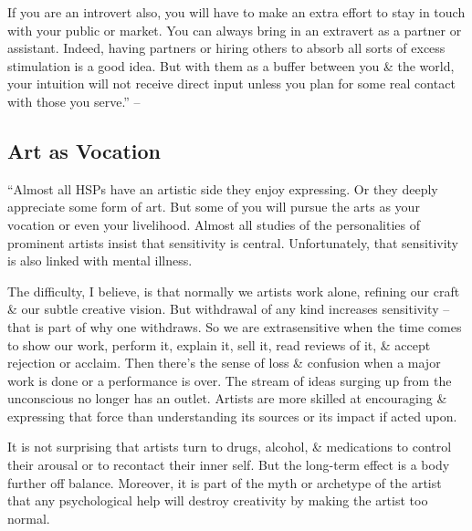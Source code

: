 \documentclass{article}
\numberwithin{equation}{section}
\begin{document}
If you are an introvert also, you will have to make an extra effort to stay in touch with your public or market. You can always bring in an extravert as a partner or assistant. Indeed, having partners or hiring others to absorb all sorts of excess stimulation is a good idea. But with them as a buffer between you \& the world, your intuition will not receive direct input unless you plan for some real contact with those you serve.'' -- \cite[pp. 154--155]{Aron2013}

\subsection{Art as Vocation}
``Almost all HSPs have an artistic side they enjoy expressing. Or they deeply appreciate some form of art. But some of you will pursue the arts as your vocation or even your livelihood. Almost all studies of the personalities of prominent artists insist that sensitivity is central. Unfortunately, that sensitivity is also linked with mental illness.

The difficulty, I believe, is that normally we artists work alone, refining our craft \& our subtle creative vision. But withdrawal of any kind increases sensitivity -- that is part of why one withdraws. So we are extrasensitive when the time comes to show our work, perform it, explain it, sell it, read reviews of it, \& accept rejection or acclaim. Then there's the sense of loss \& confusion when a major work is done or a performance is over. The stream of ideas surging up from the unconscious no longer has an outlet. Artists are more skilled at encouraging \& expressing that force than understanding its sources or its impact if acted upon.

It is not surprising that artists turn to drugs, alcohol, \& medications to control their arousal or to recontact their inner self. But the long-term effect is a body further off balance. Moreover, it is part of the myth or archetype of the artist that any psychological help will destroy creativity by making the artist too normal.
\end{document}
